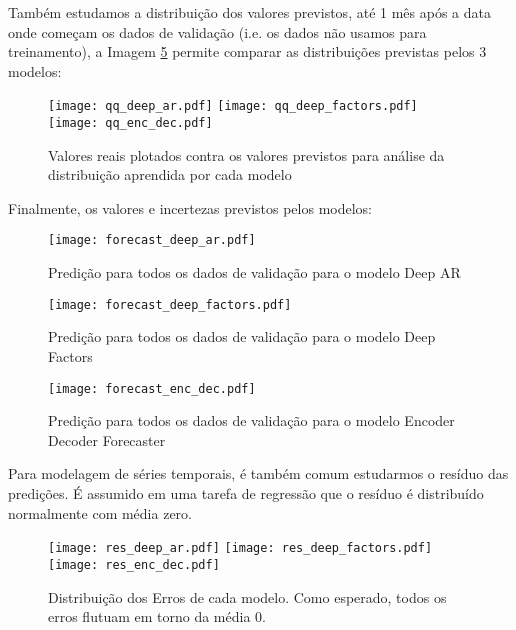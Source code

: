 Também estudamos a distribuição dos valores previstos, até 1 mês após a data
onde começam os dados de validação (i.e. os dados não usamos para treinamento), a Imagem \ref{fig:distr} permite comparar as distribuições previstas pelos 3 modelos:

\begin{figure}[H]
\label{fig:distr}
\centering
\texttt{[image: qq\_deep\_ar.pdf]} \hfill
\texttt{[image: qq\_deep\_factors.pdf]} \hfill
\texttt{[image: qq\_enc\_dec.pdf]} 
\caption{Valores reais plotados contra os valores previstos para análise da distribuição aprendida por cada modelo} 
\end{figure}


Finalmente, os valores e incertezas previstos pelos modelos:


\begin{figure}[H]
  \label{fig:fordeepar}
  \centering
\texttt{[image: forecast\_deep\_ar.pdf]} 
\caption{Predição para todos os dados de validação para o modelo Deep AR}
\end{figure}

\begin{figure}[H]
  \label{fig:fordeepfactors}
  \centering
\texttt{[image: forecast\_deep\_factors.pdf]} 
\caption{Predição para todos os dados de validação para o modelo Deep Factors}
\end{figure}

\begin{figure}[H]
  \label{fig:forencdec}
  \centering
\texttt{[image: forecast\_enc\_dec.pdf]} 
\caption{Predição para todos os dados de validação para o modelo Encoder Decoder Forecaster} 
\end{figure}


Para modelagem de séries temporais, é também comum estudarmos o resíduo das
predições. É assumido em uma tarefa de regressão que o resíduo é distribuído
normalmente com média zero.


\begin{figure}[H]
\label{fig:distr}
\centering
\texttt{[image: res\_deep\_ar.pdf]} \hfill
\texttt{[image: res\_deep\_factors.pdf]} \hfill
\texttt{[image: res\_enc\_dec.pdf]} 
\caption{Distribuição dos Erros de cada modelo. Como esperado, todos os erros flutuam em torno da média 0. } 
\end{figure}



